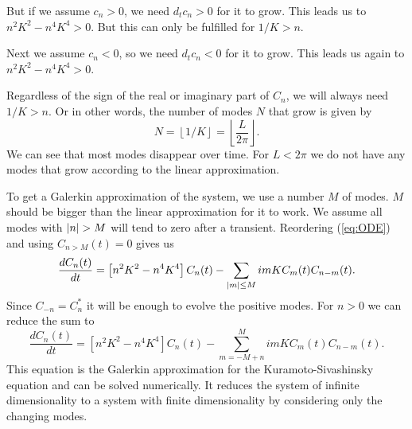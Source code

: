 But if we assume $c_n > 0$, we need $d_t c_n > 0$ for it to grow. This leads us to $n^2 K^2 - n^4 K^4 > 0$. But this can only be fulfilled for $1/K > n$.

Next we assume $c_n < 0$, so we need $d_t c_n < 0$ for it to grow. This leads us again to $n^2 K^2 - n^4 K^4 > 0$.

Regardless of the sign of the real or imaginary part of $C_n$, we will always need $1/K > n$. Or in other words, the number of modes $N$ that grow is given by
\begin{equation}
  N = \left \lfloor{1/K}\right \rfloor = \left \lfloor{\frac{L}{2\pi}}\right \rfloor.
\end{equation}
We can see that most modes disappear over time. For $L < 2 \pi$ we do not have any modes that grow according to the linear approximation.

To get a Galerkin approximation of the system, we use a number $M$ of modes. $M$ should be bigger than the linear approximation for it to work. We assume all modes with $\left\vert n \right\vert > M$ will tend to zero after a transient. Reordering (\ref{eq:ODE}) and using $C_{n > M}(t) = 0$ gives us
\begin{equation}
    \frac{d C_n(t)}{dt} = \left[ n^2 K^2 - n^4 K^4 \right] C_n(t) - \sum_{\left\vert m \right\vert \leq M} i m K C_m(t) C_{n - m}(t).
\end{equation}
Since $C_{-n} = C_n^*$ it will be enough to evolve the positive modes. For $n > 0$ we can reduce the sum to
\begin{equation}
  \frac{d C_n(t)}{dt} = \left[ n^2 K^2 - n^4 K^4 \right] C_n(t) - \sum_{m = -M + n}^{M} i m K C_m(t) C_{n - m}(t). \label{eq:galerkin}
\end{equation}
This equation is the Galerkin approximation for the Kuramoto-Sivashinsky equation and can be solved numerically. It reduces the system of infinite dimensionality to a system with finite dimensionality by considering only the changing modes.
